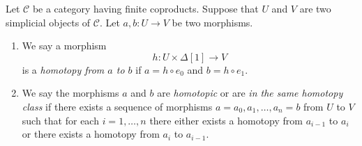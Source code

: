 \begin{definition}
\label{definition-homotopy}
Let $\mathcal{C}$ be a category having finite coproducts.
Suppose that $U$ and $V$ are two simplicial objects of $\mathcal{C}$.
Let $a, b : U \to V$ be two morphisms.
\begin{enumerate}
\item We say a morphism
$$
h : U \times \Delta[1] \longrightarrow V
$$
is a {\it homotopy from $a$ to $b$} if $a = h \circ e_0$ and
$b = h \circ e_1$.
\item We say the morphisms $a$ and $b$ are {\it homotopic} or are
{\it in the same homotopy class}
if there exists a sequence of morphisms $a = a_0, a_1, \ldots, a_n = b$
from $U$ to $V$ such that for each $i = 1, \ldots, n$ there either exists
a homotopy from $a_{i - 1}$ to $a_i$ or there exists a homotopy
from $a_i$ to $a_{i - 1}$.
\end{enumerate}
\end{definition}